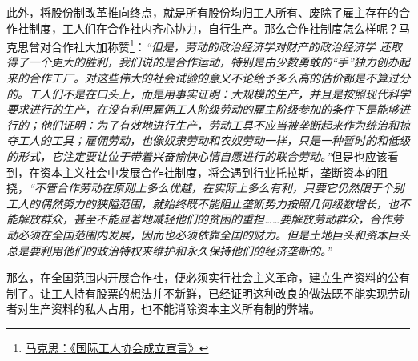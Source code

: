 \documentclass[a4paper]{article}
\begin{document}
此外，将股份制改革推向终点，就是所有股份均归工人所有、废除了雇主存在的合作社制度，工人们在合作社内齐心协力，自行生产。那么合作社制度怎么样呢？马克思曾对合作社大加称赞\footnote{\href{https://www.marxists.org/chinese/marx/marxist.org-chinese-marx-18640928.htm}{马克思：《国际工人协会成立宣言》}}：\emph{“但是，劳动的政治经济学对财产的政治经济学 还取得了一个更大的胜利，我们说的是合作运动，特别是由少数勇敢的“手”独力创办起来的合作工厂。对这些伟大的社会试验的意义不论给予多么高的估价都是不算过分的。工人们不是在口头上，而是用事实证明：大规模的生产，并且是按照现代科学要求进行的生产，在没有利用雇佣工人阶级劳动的雇主阶级参加的条件下是能够进行的；他们证明：为了有效地进行生产，劳动工具不应当被垄断起来作为统治和掠夺工人的工具；雇佣劳动，也像奴隶劳动和农奴劳动一样，只是一种暂时的和低级的形式，它注定要让位于带着兴奋愉快心情自愿进行的联合劳动。”}但是也应该看到，在资本主义社会中发展合作社制度，将会遇到行业托拉斯，垄断资本的阻挠，\emph{“不管合作劳动在原则上多么优越，在实际上多么有利，只要它仍然限于个别工人的偶然努力的狭隘范围，就始终既不能阻止垄断势力按照几何级数增长，也不能解放群众，甚至不能显著地减轻他们的贫困的重担……要解放劳动群众，合作劳动必须在全国范围内发展，因而也必须依靠全国的财力。但是土地巨头和资本巨头总是要利用他们的政治特权来维护和永久保持他们的经济垄断的。”}

那么，在全国范围内开展合作社，便必须实行社会主义革命，建立生产资料的公有制了。让工人持有股票的想法并不新鲜，已经证明这种改良的做法既不能实现劳动者对生产资料的私人占用，也不能消除资本主义所有制的弊端。
\end{document}
